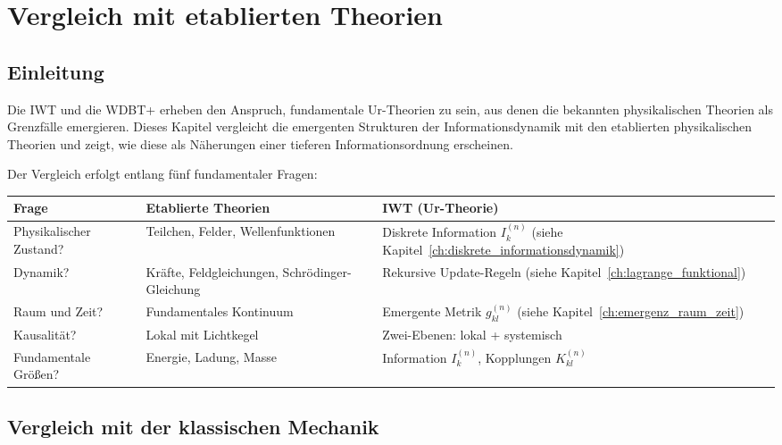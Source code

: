 
\chapter{Vergleich mit etablierten Theorien}
\label{app:vergleich}

\section{Einleitung}
\label{app:vergleich_einleitung}

Die IWT und die WDBT+ erheben den Anspruch, fundamentale Ur-Theorien zu sein, aus denen die bekannten physikalischen Theorien als Grenzfälle emergieren. Dieses Kapitel vergleicht die emergenten Strukturen der Informationsdynamik mit den etablierten physikalischen Theorien und zeigt, wie diese als Näherungen einer tieferen Informationsordnung erscheinen.

Der Vergleich erfolgt entlang fünf fundamentaler Fragen:

\begin{tabularx}{\textwidth}{|X|X|X|}
\hline
\textbf{Frage} & \textbf{Etablierte Theorien} & \textbf{IWT (Ur-Theorie)} \\
\hline
Physikalischer Zustand? & Teilchen, Felder, Wellenfunktionen & Diskrete Information \( I_k^{(n)} \) (siehe Kapitel~\ref{ch:diskrete_informationsdynamik}) \\
\hline
Dynamik? & Kräfte, Feldgleichungen, Schrödinger-Gleichung & Rekursive Update-Regeln (siehe Kapitel~\ref{ch:lagrange_funktional}) \\
\hline
Raum und Zeit? & Fundamentales Kontinuum & Emergente Metrik \( g_{kl}^{(n)} \) (siehe Kapitel~\ref{ch:emergenz_raum_zeit}) \\
\hline
Kausalität? & Lokal mit Lichtkegel & Zwei-Ebenen: lokal + systemisch \\
\hline
Fundamentale Größen? & Energie, Ladung, Masse & Information \( I_k^{(n)} \), Kopplungen \( K_{kl}^{(n)} \) \\
\hline
\end{tabularx}

\section{Vergleich mit der klassischen Mechanik}
\label{app:vergleich_klassisch}

